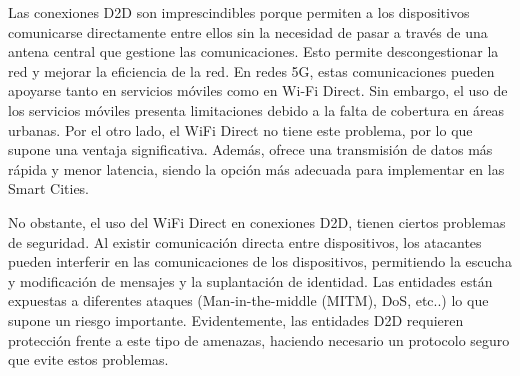 \documentclass[conference,a4paper,onecolumn,11pt]{IEEEtran} %
\begin{document}
Las conexiones D2D son imprescindibles porque permiten a los dispositivos comunicarse directamente entre ellos sin la necesidad de pasar a través de una antena central que gestione las comunicaciones. Esto permite descongestionar la red y mejorar la eficiencia de la red. En redes 5G, estas comunicaciones pueden apoyarse tanto en servicios móviles como en Wi-Fi Direct. Sin embargo, el uso de los servicios móviles presenta limitaciones debido a la falta de cobertura en áreas urbanas. Por el otro lado, el WiFi Direct no tiene este problema, por lo que supone una ventaja significativa. Además, ofrece una transmisión de datos más rápida y menor latencia, siendo la opción más adecuada para implementar en las Smart Cities.

No obstante, el uso del WiFi Direct en conexiones D2D, tienen ciertos problemas de seguridad.\cite{shen2016secure} Al existir comunicación directa entre dispositivos, los atacantes pueden interferir en las comunicaciones de los dispositivos, permitiendo la escucha y modificación de mensajes y la suplantación de identidad. Las entidades están expuestas a diferentes ataques (Man-in-the-middle (MITM), DoS, etc..) lo que supone un riesgo importante. \cite{wang2017survey} Evidentemente, las entidades D2D requieren protección frente a este tipo de amenazas, haciendo necesario un protocolo seguro que evite estos problemas.
\end{document}
